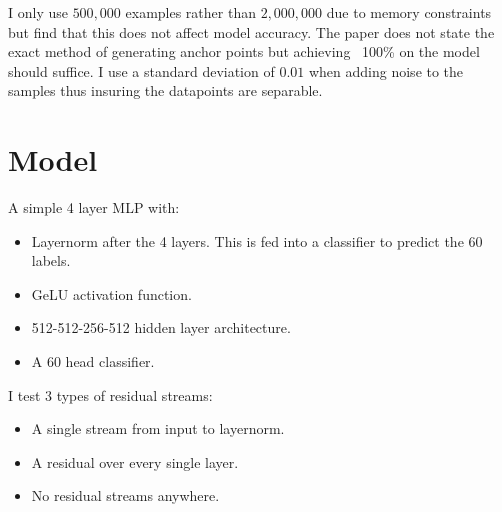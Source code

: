 I only use $500,000$ examples rather than $2,000,000$ due to memory constraints but find that this does not affect model accuracy.
The paper does not state the exact method of generating anchor points but achieving ~100\% on the model should suffice.
I use a standard deviation of $0.01$ when adding noise to the samples thus insuring the datapoints are separable.

\section{Model}

A simple 4 layer MLP with:

\begin{itemize}[nolistsep]
    \item Layernorm after the 4 layers. This is fed into a classifier to predict the 60 labels.
    \item GeLU activation function.
    \item 512-512-256-512 hidden layer architecture.
    \item A 60 head classifier.
\end{itemize}

I test 3 types of residual streams:
\begin{itemize}[nolistsep]
    \item A single stream from input to layernorm.
    \item A residual over every single layer.
    \item No residual streams anywhere.
\end{itemize}

